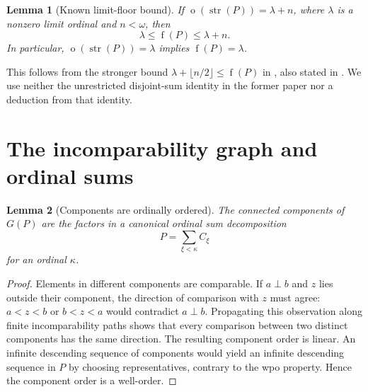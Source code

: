 \documentclass[11pt,a4paper]{article}
\newtheorem{lemma}[lemma]{Lemma}
\theoremstyle{definition}
\theoremstyle{remark}
\DeclareMathOperator{\mot}{o}
\DeclareMathOperator{\fot}{f}
\DeclareMathOperator{\str}{str}
\newcommand{\inc}{\mathbin{\perp}}
\begin{document}
\begin{lemma}[Known limit-floor bound]\label{lem:floor}
If $\mot(\str(P))=\lambda+n$, where $\lambda$ is a nonzero limit ordinal and
$n<\omega$, then
\[
\lambda\leq\fot(P)\leq\lambda+n.
\]
In particular, $\mot(\str(P))=\lambda$ implies $\fot(P)=\lambda$.
\end{lemma}

This follows from the stronger bound
$\lambda+\lfloor n/2\rfloor\leq\fot(P)$ in
\cite[Theorem~4.5]{Vialard2023}, also stated in
\cite[Theorem~5.4.4]{Vialard2024}. We use neither the unrestricted disjoint-sum
identity in the former paper nor a deduction from that identity.

\section{The incomparability graph and ordinal sums}\label{sec:graph}

\begin{lemma}[Components are ordinally ordered]\label{lem:components}
The connected components of $G(P)$ are the factors in a canonical ordinal
sum decomposition
\[
P=\sum_{\xi<\kappa} C_\xi
\]
for an ordinal $\kappa$.
\end{lemma}
\begin{proof}
Elements in different components are comparable. If $a\inc b$ and $z$ lies
outside their component, the direction of comparison with $z$ must agree:
$a<z<b$ or $b<z<a$ would contradict $a\inc b$. Propagating this observation
along finite incomparability paths shows that every comparison between two
distinct components has the same direction. The resulting component order
is linear. An infinite descending sequence of components would yield an
infinite descending sequence in $P$ by choosing representatives, contrary
to the wpo property. Hence the component order is a well-order.
\end{proof}
\end{document}
